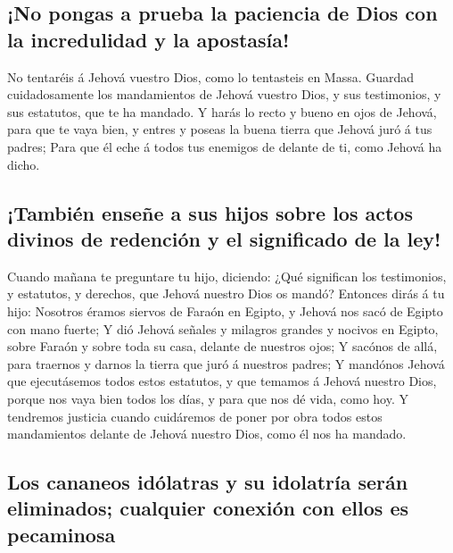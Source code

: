 \hypertarget{no-pongas-a-prueba-la-paciencia-de-dios-con-la-incredulidad-y-la-apostasuxeda}{%
\subsection{¡No pongas a prueba la paciencia de Dios con la incredulidad
y la
apostasía!}\label{no-pongas-a-prueba-la-paciencia-de-dios-con-la-incredulidad-y-la-apostasuxeda}}

 No tentaréis á Jehová vuestro Dios, como lo tentasteis
en Massa.  Guardad cuidadosamente los mandamientos de
Jehová vuestro Dios, y sus testimonios, y sus estatutos, que te ha
mandado.  Y harás lo recto y bueno en ojos de Jehová,
para que te vaya bien, y entres y poseas la buena tierra que Jehová juró
á tus padres;  Para que él eche á todos tus enemigos de
delante de ti, como Jehová ha dicho.

\hypertarget{tambiuxe9n-enseuxf1e-a-sus-hijos-sobre-los-actos-divinos-de-redenciuxf3n-y-el-significado-de-la-ley}{%
\subsection{¡También enseñe a sus hijos sobre los actos divinos de
redención y el significado de la
ley!}\label{tambiuxe9n-enseuxf1e-a-sus-hijos-sobre-los-actos-divinos-de-redenciuxf3n-y-el-significado-de-la-ley}}

 Cuando mañana te preguntare tu hijo, diciendo: ¿Qué
significan los testimonios, y estatutos, y derechos, que Jehová nuestro
Dios os mandó?  Entonces dirás á tu hijo: Nosotros éramos
siervos de Faraón en Egipto, y Jehová nos sacó de Egipto con mano
fuerte;  Y dió Jehová señales y milagros grandes y
nocivos en Egipto, sobre Faraón y sobre toda su casa, delante de
nuestros ojos;  Y sacónos de allá, para traernos y darnos
la tierra que juró á nuestros padres;  Y mandónos Jehová
que ejecutásemos todos estos estatutos, y que temamos á Jehová nuestro
Dios, porque nos vaya bien todos los días, y para que nos dé vida, como
hoy.  Y tendremos justicia cuando cuidáremos de poner por
obra todos estos mandamientos delante de Jehová nuestro Dios, como él
nos ha mandado.

\hypertarget{los-cananeos-iduxf3latras-y-su-idolatruxeda-seruxe1n-eliminados-cualquier-conexiuxf3n-con-ellos-es-pecaminosa}{%
\subsection{Los cananeos idólatras y su idolatría serán eliminados;
cualquier conexión con ellos es
pecaminosa}\label{los-cananeos-iduxf3latras-y-su-idolatruxeda-seruxe1n-eliminados-cualquier-conexiuxf3n-con-ellos-es-pecaminosa}}

